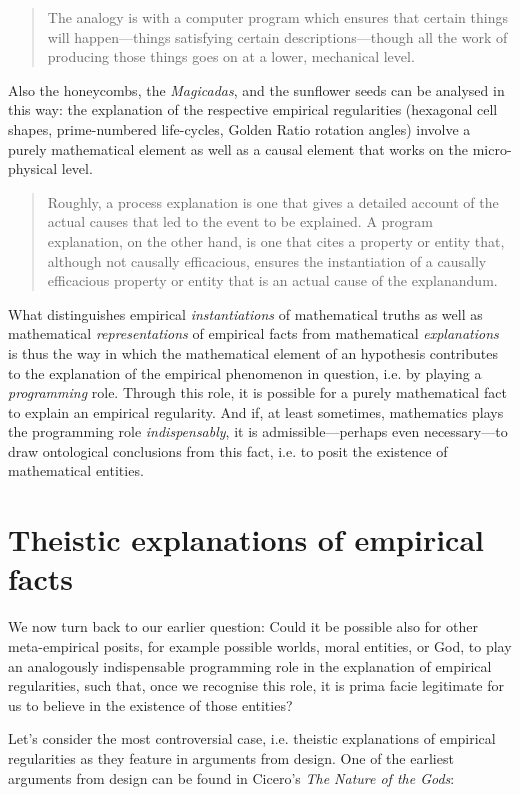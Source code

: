 \documentclass[a4paper,12pt]{article}
\begin{document}
\blockquote{The analogy is with a computer program which ensures that certain things will happen---things satisfying certain descriptions---though all the work of producing those things goes on at a lower, mechanical level. \cite[p.~114]{JacksonPettit1990}}

Also the honeycombs, the \textit{Magicadas}, and the sunflower seeds can be analysed in this way: the explanation of the respective empirical regularities (hexagonal cell shapes, prime-numbered life-cycles, Golden Ratio rotation angles) involve a purely mathematical element as well as a causal element that works on the micro-physical level.

\blockquote{Roughly, a process explanation is one that gives a detailed account of the actual causes that led to the event to be explained. A program explanation, on the other hand, is one that cites a property or entity that, although not causally efficacious, ensures the instantiation of a causally efficacious property or entity that is an actual cause of the explanandum. \cite[p.~565f]{Lyon2012}}

What distinguishes empirical \textit{instantiations} of mathematical truths as well as mathematical \textit{representations} of empirical facts from mathematical \textit{explanations} is thus the way in which the mathematical element of an hypothesis contributes to the explanation of the empirical phenomenon in question, i.e. by playing a \textit{programming} role. Through this role, it is possible for a purely mathematical fact to explain an empirical regularity. And if, at least sometimes, mathematics plays the programming role \textit{indispensably}, it is admissible---perhaps even necessary---to draw ontological conclusions from this fact, i.e. to posit the existence of mathematical entities.


\section{Theistic explanations of empirical facts}

We now turn back to our earlier question: Could it be possible also for other meta-empirical posits, for example possible worlds, moral entities, or God, to play an analogously indispensable programming role in the explanation of empirical regularities, such that, once we recognise this role, it is prima facie legitimate for us to believe in the existence of those entities?

Let's consider the most controversial case, i.e. theistic explanations of empirical regularities as they feature in arguments from design. One of the earliest arguments from design can be found in Cicero's \textit{The Nature of the Gods}:
\end{document}
